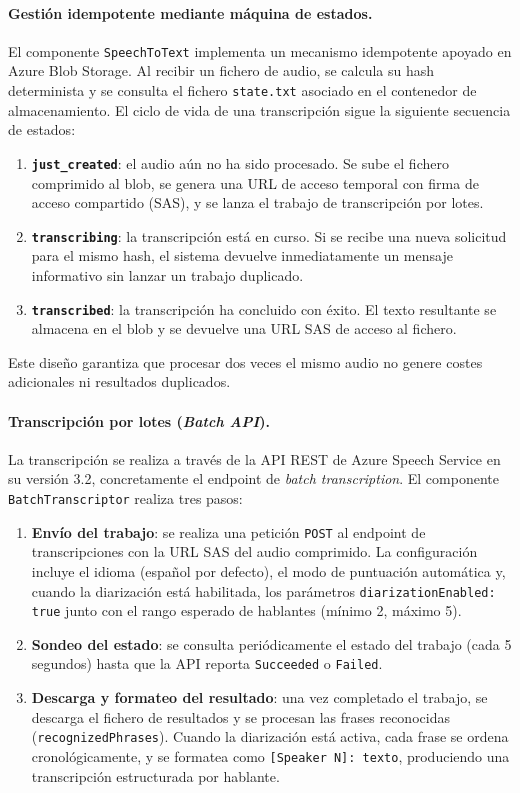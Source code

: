 \documentclass[11pt, letterpaper]{article}
\begin{document}
\paragraph{Gestión idempotente mediante máquina de estados.}
El componente \texttt{SpeechToText} implementa un mecanismo idempotente apoyado en Azure Blob Storage. Al recibir un fichero de audio, se calcula su hash determinista y se consulta el fichero \texttt{state.txt} asociado en el contenedor de almacenamiento. El ciclo de vida de una transcripción sigue la siguiente secuencia de estados:

\begin{enumerate}
    \item \textbf{\texttt{just\_created}}: el audio aún no ha sido procesado. Se sube el fichero comprimido al blob, se genera una URL de acceso temporal con firma de acceso compartido (SAS), y se lanza el trabajo de transcripción por lotes.
    \item \textbf{\texttt{transcribing}}: la transcripción está en curso. Si se recibe una nueva solicitud para el mismo hash, el sistema devuelve inmediatamente un mensaje informativo sin lanzar un trabajo duplicado.
    \item \textbf{\texttt{transcribed}}: la transcripción ha concluido con éxito. El texto resultante se almacena en el blob y se devuelve una URL SAS de acceso al fichero.
\end{enumerate}

Este diseño garantiza que procesar dos veces el mismo audio no genere costes adicionales ni resultados duplicados.

\paragraph{Transcripción por lotes (\textit{Batch API}).}
La transcripción se realiza a través de la API REST de Azure Speech Service en su versión 3.2, concretamente el endpoint de \textit{batch transcription}. El componente \texttt{BatchTranscriptor} realiza tres pasos:

\begin{enumerate}
    \item \textbf{Envío del trabajo}: se realiza una petición \texttt{POST} al endpoint de transcripciones con la URL SAS del audio comprimido. La configuración incluye el idioma (español por defecto), el modo de puntuación automática y, cuando la diarización está habilitada, los parámetros \texttt{diarizationEnabled: true} junto con el rango esperado de hablantes (mínimo 2, máximo 5).
    \item \textbf{Sondeo del estado}: se consulta periódicamente el estado del trabajo (cada 5 segundos) hasta que la API reporta \texttt{Succeeded} o \texttt{Failed}.
    \item \textbf{Descarga y formateo del resultado}: una vez completado el trabajo, se descarga el fichero de resultados y se procesan las frases reconocidas (\texttt{recognizedPhrases}). Cuando la diarización está activa, cada frase se ordena cronológicamente, y se formatea como \texttt{[Speaker N]: texto}, produciendo una transcripción estructurada por hablante.
\end{enumerate}
\end{document}
